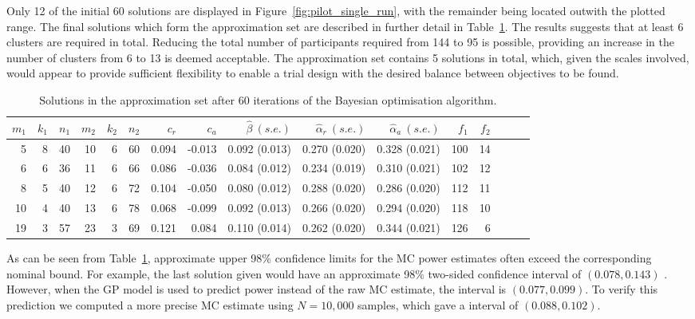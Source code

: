 \documentclass{article} %
\begin{document}
Only 12 of the initial 60 solutions are displayed in Figure~\ref{fig:pilot_single_run}, with the remainder being located outwith the plotted range. The final solutions which form the approximation set are described in further detail in Table~\ref{tab:pilot_single_run}. The results suggests that at least 6 clusters are required in total. Reducing the total number of participants required from 144 to 95 is possible, providing an increase in the number of clusters from 6 to 13 is deemed acceptable. The approximation set contains 5 solutions in total, which, given the scales involved, would appear to provide sufficient flexibility to enable a trial design with the desired balance between objectives to be found.

\begin{table}
\centering
\begin{tabular}{rrrrrrrrrrrrrrrr}
\toprule 
$m_{1}$ & $k_{1}$ & $n_{1}$ & $m_{2}$ & $k_{2}$ & $n_{2}$ & $c_{r}$ & $c_{a}$ & $\hat{\beta}~(s.e.)$ & $\hat{\alpha}_{r}~(s.e.)$ & $\hat{\alpha}_{a}~(s.e.)$ & $f_{1}$ & $f_{2}$ \\
\midrule
5 & 8 & 40 & 10 & 6 & 60 & 0.094 & -0.013 & 0.092 (0.013) & 0.270 (0.020) & 0.328 (0.021) & 100 & 14 \\ 
6 & 6 & 36 & 11 & 6 & 66 & 0.086 & -0.036 & 0.084 (0.012) & 0.234 (0.019) & 0.310 (0.021) & 102 & 12 \\ 
8 & 5 & 40 & 12 & 6 & 72 & 0.104 & -0.050 & 0.080 (0.012) & 0.288 (0.020) & 0.286 (0.020) & 112 & 11 \\ 
10 & 4 & 40 & 13 & 6 & 78 & 0.068 & -0.099 & 0.092 (0.013) & 0.266 (0.020) & 0.294 (0.020) & 118 & 10 \\ 
19 & 3 & 57 & 23 & 3 & 69 & 0.121 & 0.084 & 0.110 (0.014) & 0.262 (0.020) & 0.344 (0.021) & 126 & 6 \\ 
\bottomrule
\end{tabular}
\caption{Solutions in the approximation set after 60 iterations of the Bayesian optimisation algorithm.} 
\label{tab:pilot_single_run}
\end{table}


As can be seen from Table~\ref{tab:pilot_single_run}, approximate upper 98\% confidence limits for the MC power estimates often exceed the corresponding nominal bound. For example, the last solution given would have an approximate 98\% two-sided confidence interval of $(0.078, 0.143)$ . However, when the GP model is used to predict power instead of the raw MC estimate, the interval is $(0.077, 0.099)$.  To verify this prediction we computed a more precise MC estimate using $N = 10,000$ samples, which gave a interval of $(0.088, 0.102)$.
\end{document}
